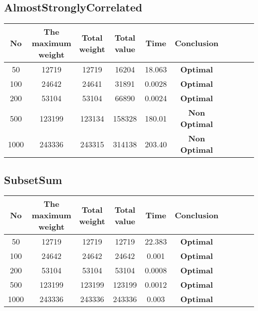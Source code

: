 \documentclass{article}
\begin{document}
\subsection{AlmostStronglyCorrelated}
    \begin{center}
        \begin{tabular}{|c|c| c|c| c|c| c|c| c|c|}
        \hline
            No& The maximum weight & Total weight & Total value& Time&Conclusion \\
        \hline
            50 & 12719 & 12719 & 16204 & 18.063 & \textbf{Optimal}\\
            100 & 24642 & 24641 & 31891 & 0.0028 & \textbf{Optimal}\\
            200 & 53104 & 53104 & 66890 & 0.0024 & \textbf{Optimal}\\
            500 & 123199 & 123134 & 158328 & 180.01 & \textbf{Non Optimal}\\
            1000 & 243336 & 243315 & 314138 & 203.40 & \textbf{Non Optimal}\\
    \hline
        \hline 
        \end{tabular}
    \end{center}
\subsection{SubsetSum}
    \begin{center}
        \begin{tabular}{|c|c| c|c| c|c| c|c| c|c|}
        \hline
            No& The maximum weight & Total weight & Total value& Time&Conclusion \\
        \hline
            50 & 12719 & 12719 & 12719 & 22.383 & \textbf{Optimal}\\
            100 & 24642 & 24642 & 24642 & 0.001 & \textbf{Optimal}\\
            200 & 53104 & 53104 & 53104 & 0.0008 & \textbf{Optimal}\\
            500 & 123199 & 123199 & 123199 & 0.0012 & \textbf{Optimal}\\
            1000 & 243336 & 243336 & 243336 & 0.003 & \textbf{Optimal}\\
    \hline
        \hline 
        \end{tabular}
    \end{center}
\end{document}
